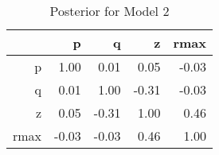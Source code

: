 \begin{table}[ht]
\centering
\begin{tabular}{rrrrr}
  \hline
 & p & q & z & rmax \\ 
  \hline
p & 1.00 & 0.01 & 0.05 & -0.03 \\ 
  q & 0.01 & 1.00 & -0.31 & -0.03 \\ 
  z & 0.05 & -0.31 & 1.00 & 0.46 \\ 
  rmax & -0.03 & -0.03 & 0.46 & 1.00 \\ 
   \hline
\end{tabular}
\caption{Posterior for Model 2} 
\label{tab:param_correlations_post_model_2}
\end{table}

